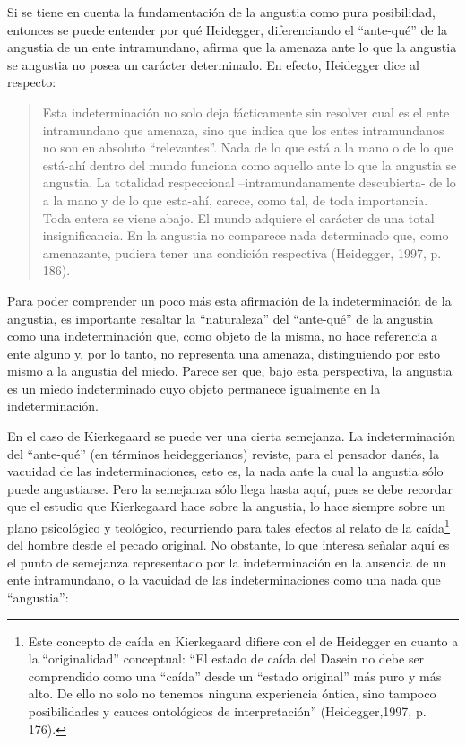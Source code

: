 \documentclass[]{article}
\begin{document}
Si se tiene en cuenta la fundamentación de la angustia como pura posibilidad, entonces se puede entender por qué Heidegger, diferenciando el ``ante-qué'' de la angustia de un ente intramundano, afirma que la amenaza ante lo que la angustia se angustia no posea un carácter determinado. En efecto, Heidegger dice al respecto:

\begin{quote}
Esta indeterminación no solo deja fácticamente sin resolver cual es el ente intramundano que amenaza, sino que indica que los entes intramundanos no son en absoluto ``relevantes''. Nada de lo que está a la mano o de lo que está-ahí dentro del mundo funciona como aquello ante lo que la angustia se angustia. La totalidad respeccional --intramundanamente descubierta- de lo a la mano y de lo que esta-ahí, carece, como tal, de toda importancia. Toda entera se viene abajo. El mundo adquiere el carácter de una total insignificancia. En la angustia no comparece nada determinado que, como amenazante, pudiera tener una condición respectiva (Heidegger, 1997, p. 186).
\end{quote}

Para poder comprender un poco más esta afirmación de la indeterminación de la angustia, es importante resaltar la ``naturaleza'' del ``ante-qué'' de la angustia como una indeterminación que, como objeto de la misma, no hace referencia a ente alguno y, por lo tanto, no representa una amenaza, distinguiendo por esto mismo a la angustia del miedo. Parece ser que, bajo esta perspectiva, la angustia es un miedo indeterminado cuyo objeto permanece igualmente en la indeterminación.

En el caso de Kierkegaard se puede ver una cierta semejanza. La indeterminación del ``ante-qué'' (en términos heideggerianos) reviste, para el pensador danés, la vacuidad de las indeterminaciones, esto es, la nada ante la cual la angustia sólo puede angustiarse. Pero la semejanza sólo llega hasta aquí, pues se debe recordar que el estudio que Kierkegaard hace sobre la angustia, lo hace siempre sobre un plano psicológico y teológico, recurriendo para tales efectos al relato de la caída\footnote{Este concepto de caída en Kierkegaard difiere con el de Heidegger en cuanto a la ``originalidad'' conceptual: ``El estado de caída del Dasein no debe ser comprendido como una ``caída'' desde un ``estado original'' más puro y más alto. De ello no solo no tenemos ninguna experiencia óntica, sino tampoco posibilidades y cauces ontológicos de interpretación'' (Heidegger,1997, p. 176).} del hombre desde el pecado original. No obstante, lo que interesa señalar aquí es el punto de semejanza representado por la indeterminación en la ausencia de un ente intramundano, o la vacuidad de las indeterminaciones como una nada que ``angustia'':
\end{document}
